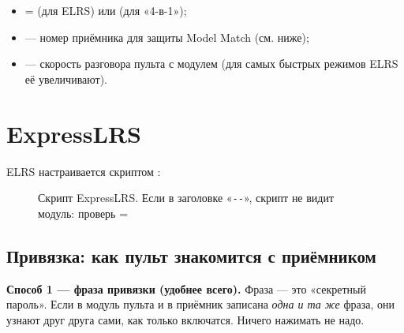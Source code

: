 \begin{center}
\end{center}

\begin{itemize}
  \item {} =  (для ELRS) или  (для «4-в-1»);
  \item {} --- номер приёмника для защиты Model Match (см. ниже);
  \item {} --- скорость разговора пульта с модулем (для самых быстрых режимов ELRS
        её увеличивают).
\end{itemize}

\section{ExpressLRS}

ELRS настраивается скриптом :

\begin{figure}[H]
\centering
{}
\caption{Скрипт ExpressLRS. Если в заголовке «\texttt{-{}-}», скрипт не видит модуль:
проверь  = }
\end{figure}

\subsection{Привязка: как пульт знакомится с приёмником}

\textbf{Способ 1 --- фраза привязки (удобнее всего).} Фраза --- это «секретный пароль». Если
в модуль пульта и в приёмник записана \emph{одна и та же} фраза, они узнают друг друга сами,
как только включатся. Ничего нажимать не надо.

